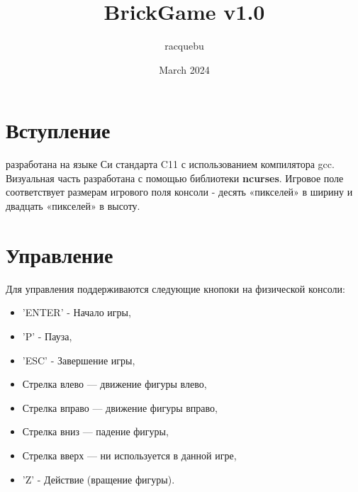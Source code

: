 \documentclass{article}
\title{BrickGame v1.0}
\author{racquebu}
\date{March 2024}
\begin{document}
\maketitle
\section{Вступление}
 разработана на языке Си стандарта C11 с использованием  компилятора gcc. Визуальная часть разработана с помощью библиотеки \textbf{ncurses}. Игровое поле соответствует размерам игрового поля консоли - десять «пикселей» в ширину и двадцать «пикселей» в высоту.

\section{Управление}
Для управления поддерживаются следующие кнопоки на физической консоли:
\begin{itemize}
    \item 'ENTER' - Начало игры,
    \item 'P' - Пауза,
    \item 'ESC' - Завершение игры,
    \item Стрелка влево — движение фигуры влево,
    \item Стрелка вправо — движение фигуры вправо,
    \item Стрелка вниз — падение фигуры,
    \item Стрелка вверх — ни используется в данной игре,
    \item 'Z' - Действие (вращение фигуры).

\end{itemize}
\end{document}
